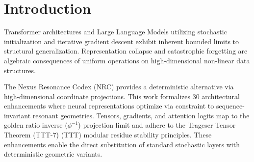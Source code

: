 \section{Introduction}

Transformer architectures and Large Language Models utilizing stochastic initialization and iterative gradient descent exhibit inherent bounded limits to structural generalization. Representation collapse and catastrophic forgetting are algebraic consequences of uniform operations on high-dimensional non-linear data structures. 

The Nexus Resonance Codex (NRC) provides a deterministic alternative via high-dimensional coordinate projections. This work formalizes 30 architectural enhancements where neural representations optimize via constraint to sequence-invariant resonant geometries. Tensors, gradients, and attention logits map to the golden ratio inverse ($\phi^{-1}$) projection limit and adhere to the Trageser Tensor Theorem (TTT-7) (TTT) modular residue stability principles. These enhancements enable the direct substitution of standard stochastic layers with deterministic geometric variants.

